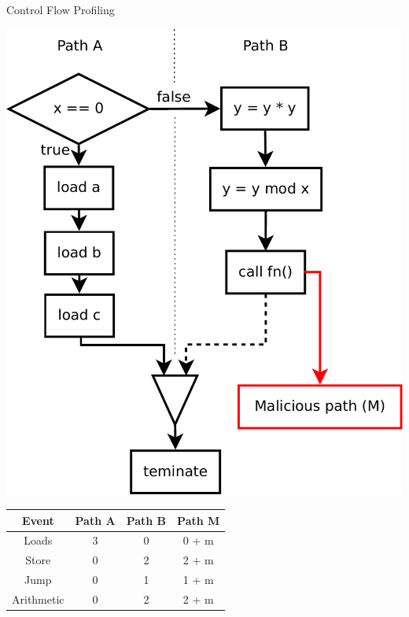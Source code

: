 \documentclass[aspectratio=169]{beamer}
\begin{document}
\begin{frame}{Control Flow Profiling}
    \begin{center}
        \begin{minipage}{0.45\linewidth}
            \begin{center}
                \includegraphics[width=.83\textwidth]{images/control_flow_1.pdf}
            \end{center}
        \end{minipage}
        \hfill
        \begin{minipage}{0.52\linewidth}
            \begin{center}
                \begin{tabular}{c|c|c|c}
                    Event      & Path A & Path B & Path M             \\
                    \hline
                    Loads      & 3      & 0      & 0 + {\color{red}m} \\
                    Store      & 0      & 2      & 2 + {\color{red}m} \\
                    Jump       & 0      & 1      & 1 + {\color{red}m} \\
                    Arithmetic & 0      & 2      & 2 + {\color{red}m} \\
                \end{tabular}
            \end{center}
        \end{minipage}
    \end{center}
\end{frame}
\end{document}
